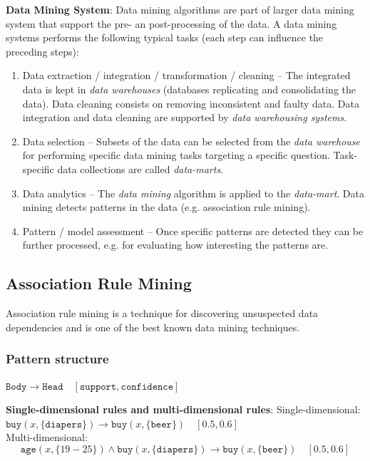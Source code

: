   \textbf{Data Mining System}: Data mining algorithms are part of larger data mining system that support the pre- an post-processing of the data. A data mining systems performs the following typical tasks (each step can influence the preceding steps):
  \begin{enumerate}
    \item Data extraction / integration / transformation / cleaning -- The integrated data is kept in \emph{data warehouses} (databases replicating and consolidating the data). Data cleaning consists on removing inconsistent and faulty data. Data integration and data cleaning are supported by \emph{data warehousing systems}.
    \item Data selection -- Subsets of the data can be selected from the \emph{data warehouse} for performing specific data mining tasks targeting a specific question. Task-specific data collections are called \emph{data-marts}.
    \item Data analytics -- The \emph{data mining} algorithm is applied to the \emph{data-mart}. Data mining detects patterns in the data (e.g. association rule mining).
    \item Pattern / model assessment -- Once specific patterns are detected they can be further processed, e.g. for evaluating how interesting the patterns are.
  \end{enumerate}

\subsection{Association Rule Mining} %
\label{sub:association_rule_mining}
  Association rule mining is a technique for discovering unsuspected data dependencies and is one of the best known data mining techniques.

  \subsubsection{Pattern structure} %
  \label{ssub:pattern_structure}
    $\texttt{Body}\rightarrow \texttt{Head}\quad [\texttt{support}, \texttt{confidence}]$

    \textbf{Single-dimensional rules and multi-dimensional rules}:
      Single-dimensional: $\texttt{buy}(x, \{\texttt{diapers}\})\rightarrow \texttt{buy}(x, \{\texttt{beer}\})\quad [0.5, 0.6]$\\
      Multi-dimensional: $$\texttt{age}(x, \{19-25\}) \wedge \texttt{buy}(x, \{\texttt{diapers}\})\rightarrow \texttt{buy}(x, \{\texttt{beer}\})\quad [0.5, 0.6]$$

